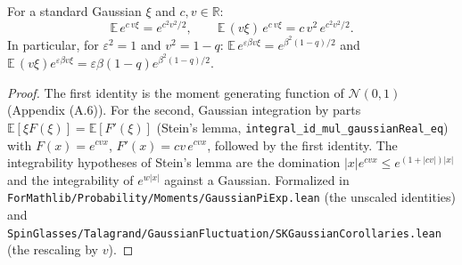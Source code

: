 \begin{lemma}
\label{lem:sg-tal:exp-gauss-averages}
  \leanok
{}
For a standard Gaussian $\xi$ and $c,v\in\mathbb R$:
\[
\mathbb E\,e^{c\,v\xi}=e^{c^2v^2/2},\qquad \mathbb E\,(v\xi)\,e^{c\,v\xi}=c\,v^2\,e^{c^2v^2/2}.
\]
In particular, for $\varepsilon^2=1$ and $v^2=1-q$: $\mathbb E\,e^{\varepsilon\beta v\xi}=e^{\beta^2(1-q)/2}$ and $\mathbb E\,(v\xi)e^{\varepsilon\beta v\xi}=\varepsilon\beta(1-q)e^{\beta^2(1-q)/2}$.
\end{lemma}
\begin{proof}
  \leanok
The first identity is the moment generating function of $\mathcal N(0,1)$ (Appendix (A.6)).  For the second, Gaussian integration by parts $\mathbb E[\xi F(\xi)]=\mathbb E[F'(\xi)]$ (Stein's lemma, \texttt{integral\_id\_mul\_gaussianReal\_eq}) with $F(x)=e^{cvx}$,
$F'(x)=cv\,e^{cvx}$, followed by the first identity.  The integrability hypotheses of Stein's lemma are the domination $|x|e^{cvx}\le e^{(1+|cv|)|x|}$ and the integrability of $e^{w|x|}$ against a Gaussian.
Formalized in \texttt{ForMathlib/Probability/Moments/GaussianPiExp.lean} (the unscaled identities) and \texttt{SpinGlasses/Talagrand/GaussianFluctuation/SKGaussianCorollaries.lean} (the rescaling by $v$).
\end{proof}

